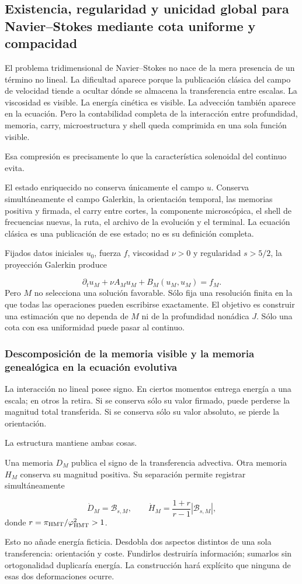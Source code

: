\subsection{Existencia, regularidad y unicidad global para Navier–Stokes mediante cota uniforme y compacidad}
El problema tridimensional de Navier–Stokes no nace de la mera presencia de un término no lineal. La dificultad aparece porque la publicación clásica del campo de velocidad tiende a ocultar dónde se almacena la transferencia entre escalas. La viscosidad es visible. La energía cinética es visible. La advección también aparece en la ecuación. Pero la contabilidad completa de la interacción entre profundidad, memoria, carry, microestructura y shell queda comprimida en una sola función visible.\par
Esa compresión es precisamente lo que la característica solenoidal del continuo evita.\par
El estado enriquecido no conserva únicamente el campo \(u\). Conserva simultáneamente el campo Galerkin, la orientación temporal, las memorias positiva y firmada, el carry entre cortes, la componente microscópica, el shell de frecuencias nuevas, la ruta, el archivo de la evolución y el terminal. La ecuación clásica es una publicación de ese estado; no es su definición completa.\par
Fijados datos iniciales \(u_0\), fuerza \(f\), viscosidad \(\nu>0\) y regularidad \(s>5/2\), la proyección Galerkin produce\par
\[
\partial_tu_M+\nu A_Mu_M+B_M(u_M,u_M)=f_M.
\]
Pero \(M\) no selecciona una solución favorable. Sólo fija una resolución finita en la que todas las operaciones pueden escribirse exactamente. El objetivo es construir una estimación que no dependa de \(M\) ni de la profundidad nonádica \(J\). Sólo una cota con esa uniformidad puede pasar al continuo.\par
{}
\subsubsection{Descomposición de la memoria visible y la memoria genealógica en la ecuación evolutiva}
La interacción no lineal posee signo. En ciertos momentos entrega energía a una escala; en otros la retira. Si se conserva sólo su valor firmado, puede perderse la magnitud total transferida. Si se conserva sólo su valor absoluto, se pierde la orientación.\par
La estructura mantiene ambas cosas.\par
Una memoria \(D_M\) publica el signo de la transferencia advectiva. Otra memoria \(H_M\) conserva su magnitud positiva. Su separación permite registrar simultáneamente\par
\[
\dot D_M=\mathscr B_{s,M},
\qquad
\dot H_M=\frac{1+r}{r-1}|\mathscr B_{s,M}|,
\]
donde \(r=\pi_{\rm HMT}/\varphi_{\rm HMT}^2>1\).\par
Esto no añade energía ficticia. Desdobla dos aspectos distintos de una sola transferencia: orientación y coste. Fundirlos destruiría información; sumarlos sin ortogonalidad duplicaría energía. La construcción hará explícito que ninguna de esas dos deformaciones ocurre.\par
{}
